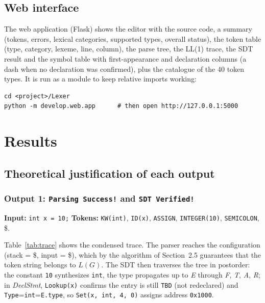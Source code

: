\documentclass[11pt,a4paper]{article}
\newcommand{\nt}[1]{\textit{#1}}
\begin{document}
\subsection{Web interface}
The web application (Flask) shows the editor with the source code, a summary (tokens, errors, lexical categories, supported types, overall status), the token table (type, category, lexeme, line, column), the parse tree, the LL(1) trace, the SDT result and the symbol table with first-appearance and declaration columns (a dash when no declaration was confirmed), plus the catalogue of the 40 token types. It is run as a module to keep relative imports working:
\begin{lstlisting}
cd <project>/Lexer
python -m develop.web.app      # then open http://127.0.0.1:5000
\end{lstlisting}

\section{Results}
\label{sec:results}

\subsection{Theoretical justification of each output}

\subsubsection{Output 1: \texttt{Parsing Success!} and \texttt{SDT Verified!}}
\textbf{Input:} \texttt{int x = 10;} \quad \textbf{Tokens:} \texttt{KW(int)}, \texttt{ID(x)}, \texttt{ASSIGN}, \texttt{INTEGER(10)}, \texttt{SEMICOLON}, \$.

Table~\ref{tab:trace} shows the condensed trace. The parser reaches the configuration (stack = \$, input = \$), which by the algorithm of Section~2.5 guarantees that the token string belongs to $L(G)$. The SDT then traverses the tree in postorder: the constant \texttt{10} synthesizes \texttt{int}, the type propagates up to \nt{E} through \nt{F}, \nt{T}, \nt{A}, \nt{R}; in \nt{DeclStmt}, \texttt{Lookup(x)} confirms the entry is still \texttt{TBD} (not redeclared) and \texttt{Type}=\texttt{int}=\texttt{E.type}, so \texttt{Set(x, int, 4, 0)} assigns address \texttt{0x1000}.
\end{document}
